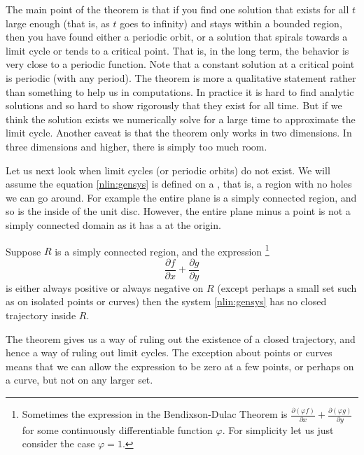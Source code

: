 The main point of the theorem is that if you find one solution that exists
for all $t$ large enough (that is, as $t$ goes to infinity) and stays
within a bounded region, then
you have found either a periodic orbit, or a solution that spirals towards a
limit cycle or tends to a critical point.
That is, in the long term, the
behavior is very close to a periodic function.
Note that a constant solution at a critical point is periodic (with
any period).
The theorem is more a qualitative statement rather than
something to help us in computations.  In practice it is hard to find
analytic solutions and so hard to show rigorously that they exist for all
time.
But if we think the solution exists we numerically solve for a
large time to approximate the limit cycle.
Another caveat is that the theorem only works in two
dimensions.  In three dimensions and higher, there is simply too much room.

Let us next look when limit cycles (or periodic orbits) do not exist.
We will assume
the equation \eqref{nlin:gensys} is defined on a
\emph{}, that is, a region with no holes
we can go around.  For example the entire plane is a simply
connected region, and so is the inside of the unit disc.  However,
the entire plane minus a point is not a simply connected domain as it has a
 at the origin.

\begin{theorem}%
Suppose $R$ is a simply connected region,
and the expression%
\footnote{Sometimes the expression in the Bendixson-Dulac Theorem is
$\frac{\partial (\varphi f)}{\partial x} + \frac{\partial (\varphi
g)}{\partial y}$
for some continuously differentiable function $\varphi$.  For simplicity
let us just consider the case $\varphi = 1$.}
\begin{equation*}
\frac{\partial f}{\partial x} + \frac{\partial g}{\partial y}
\end{equation*}
is either always positive or always negative
on $R$ (except perhaps a small set such as on isolated points or curves)
then the system \eqref{nlin:gensys}
has no closed trajectory inside $R$.
\end{theorem}

The theorem gives us a way of ruling out the existence of a closed
trajectory, and hence a
way of ruling out limit cycles.
The exception about points or curves 
means that we can allow the expression to be zero at a few points,
or perhaps on a curve, but not on any larger set.

